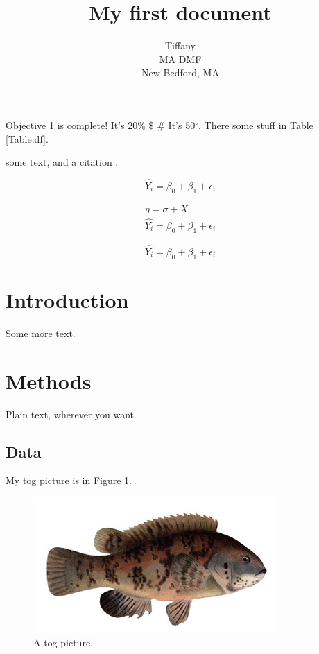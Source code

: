 \documentclass{article}
\author{Tiffany\\MA DMF\\New Bedford, MA}
\date{}
\title{My first document}
\begin{document}
\maketitle	

\tableofcontents

\listoffigures
\listoftables	
Objective 1 is complete! It's 20\% \$ \# It's 50$^\circ$. There some stuff in Table \ref{Table:df}.

some text, and a citation \citep{benoit2015generalized, maunder2004standardizing}.

\[ \hat{Y_i} = \beta_0 + \beta_1 + \epsilon_i  \]

\begin{eqnarray}
\eta = \sigma + X \\
\hat{Y_i} = \beta_0 + \beta_1 + \epsilon_i
\end{eqnarray}

\begin{equation}
\hat{Y_i} = \beta_0 + \beta_1 + \epsilon_i
\end{equation}



\section{Introduction}
 Some more text.
 
\section{Methods}
Plain text, wherever you want.
\subsection{Data}
My tog picture is in Figure \ref{Fig:tog}.

\begin{figure}[H]
	\centering
\includegraphics[scale=0.5]{tog.jpg}
\caption{A tog picture.}
\label{Fig:tog}
\end{figure}
\end{document}
